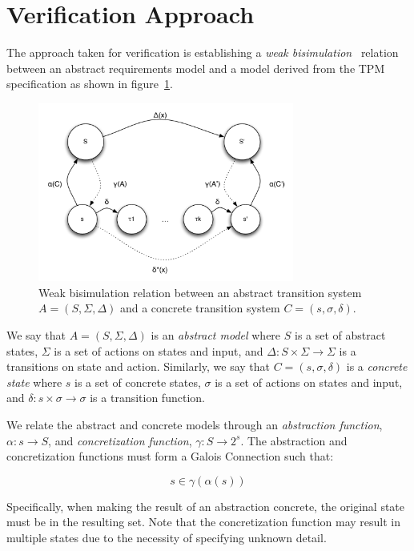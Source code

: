 \documentclass[10pt]{article}
\begin{document}
\section{Verification Approach}

The approach taken for verification is establishing a \emph{weak
  bisimulation}~\citep{Sangiorgi:12:Introduction-to} relation between
an abstract requirements model and a model derived from the TPM
specification as shown in figure~\ref{fig:bisimulation}.

\begin{figure}[hbtp]
  \centering
  \includegraphics[width=0.75\textwidth]{figures/bisimulation.pdf}
  \caption{Weak bisimulation relation between an abstract transition
    system $A=(S,\Sigma,\Delta)$ and a concrete transition system
    $C=(s,\sigma,\delta)$.}
  \label{fig:bisimulation} 
\end{figure}

We say that $A=(S,\Sigma,\Delta)$ is an \emph{abstract model} where
$S$ is a set of abstract states, $\Sigma$ is a set of actions on
states and input, and $\Delta : S\times\Sigma\rightarrow\Sigma$ is a
transitions on state and action.  Similarly, we say that
$C=(s,\sigma,\delta)$ is a \emph{concrete state } where $s$ is a set
of concrete states, $\sigma$ is a set of actions on states and input,
and $\delta : s\times\sigma\rightarrow\sigma$ is a transition
function.

We relate the abstract and concrete models through an \emph{abstraction
function}, $\alpha:s\rightarrow S$, and \emph{concretization
function}, $\gamma:S\rightarrow 2^s$.  The abstraction and
concretization functions must form a Galois Connection such that:

\[s\in\gamma(\alpha(s))\]

\noindent Specifically, when making the result of an abstraction
concrete, the original state must be in the resulting set.  Note that
the concretization function may result in multiple states due to the
necessity of specifying unknown detail.
\end{document}
